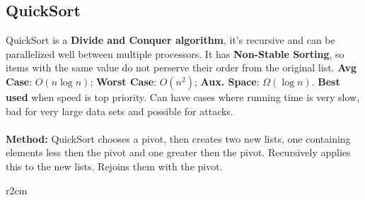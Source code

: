 \documentclass{article}
\newcommand{\thickbox}[1]{\setlength{\fboxrule}{1.3pt}\fbox{#1}\setlength{\fboxrule}{0.4pt}}
\begin{document}

\subsection{QuickSort}
QuickSort is a {\bf Divide and Conquer algorithm}, it's recursive and can be parallelized well between multiple processors. It has {\bf Non-Stable Sorting}, so items with the same value do not perserve their order from the original list. {\bf Avg Case}: $O(n \log n)$; {\bf Worst Case}: $O(n^2)$; {\bf Aux. Space}: $\Omega(\log n)$. {\bf Best used} when speed is top priority. Can have cases where running time is very slow, bad for very large data sets and possible for attacks.
\\ \\
{\bf Method:} QuickSort chooses a pivot, then creates two new lists, one containing elements less then the pivot and one greater then the pivot. Recursively applies this to the new lists. Rejoins them with the pivot.


\begin{wrapfigure}{r}{2cm}
\end{wrapfigure}
\end{document}
